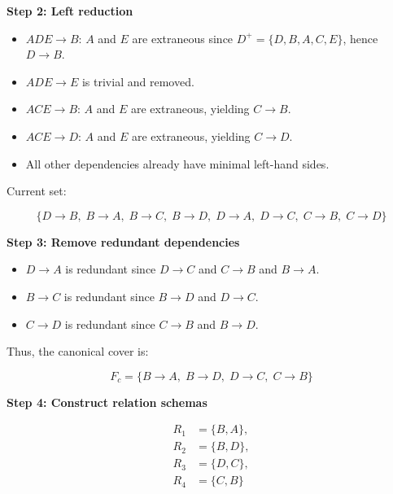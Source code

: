 \textbf{Step 2: Left reduction}

\begin{itemize}

    \item \(ADE \to B\): \(A\) and \(E\) are extraneous since \(D^+ = \{D,B,A,C,E\}\), hence \(D \to B\).

    \item \(ADE \to E\) is trivial and removed.

    \item \(ACE \to B\): \(A\) and \(E\) are extraneous, yielding \(C \to B\).

    \item \(ACE \to D\): \(A\) and \(E\) are extraneous, yielding \(C \to D\).

    \item All other dependencies already have minimal left-hand sides.

\end{itemize}

Current set:

\[
    \{ D \to B,\; B \to A,\; B \to C,\; B \to D,\; D \to A,\; D \to C,\; C \to B,\; C \to D \}
\]

\textbf{Step 3: Remove redundant dependencies}

\begin{itemize}

    \item \(D \to A\) is redundant since \(D \to C\) and \(C \to B\) and \(B \to A\).

    \item \(B \to C\) is redundant since \(B \to D\) and \(D \to C\).

    \item \(C \to D\) is redundant since \(C \to B\) and \(B \to D\).

\end{itemize}

Thus, the canonical cover is:

\[
    F_c = \{ B \to A,\; B \to D,\; D \to C,\; C \to B \}
\]

\textbf{Step 4: Construct relation schemas}

\begin{align*}
    R_1 &= \{B, A\}, \\
    R_2 &= \{B, D\}, \\
    R_3 &= \{D, C\}, \\
    R_4 &= \{C, B\}
\end{align*}

